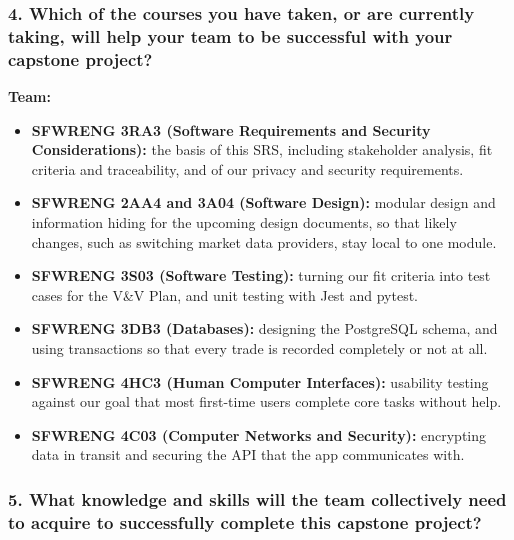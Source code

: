 \documentclass[12pt]{article}
\begin{document}
\subsubsection*{4. Which of the courses you have taken, or are currently
taking, will help your team to be successful with your capstone project?}

\textbf{Team:}
\begin{itemize}
  \item \textbf{SFWRENG 3RA3 (Software Requirements and Security
  Considerations):} the basis of this SRS, including stakeholder analysis, fit
  criteria and traceability, and of our privacy and security requirements.
  \item \textbf{SFWRENG 2AA4 and 3A04 (Software Design):} modular design and
  information hiding for the upcoming design documents, so that likely changes,
  such as switching market data providers, stay local to one module.
  \item \textbf{SFWRENG 3S03 (Software Testing):} turning our fit criteria into
  test cases for the V\&V Plan, and unit testing with Jest and pytest.
  \item \textbf{SFWRENG 3DB3 (Databases):} designing the PostgreSQL schema, and
  using transactions so that every trade is recorded completely or not at all.
  \item \textbf{SFWRENG 4HC3 (Human Computer Interfaces):} usability testing
  against our goal that most first-time users complete core tasks without
  help.
  \item \textbf{SFWRENG 4C03 (Computer Networks and Security):} encrypting data
  in transit and securing the API that the app communicates with.
\end{itemize}

\subsubsection*{5. What knowledge and skills will the team collectively need to
acquire to successfully complete this capstone project?}
\end{document}
